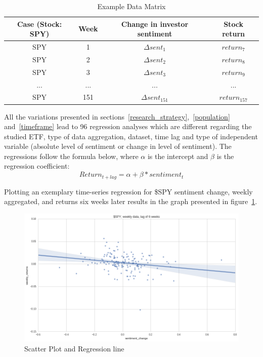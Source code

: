 \begin{table}[ht]
\centering
\begin{tabular}{ c c c c }
Case (Stock: SPY) & Week & Change in investor sentiment & Stock return  \\\hline
SPY & 1 & \( \Delta sent_1 \) & \( return_7 \) \\
SPY & 2 & \( \Delta sent_2 \) & \( return_8 \) \\
SPY & 3 & \( \Delta sent_3 \) & \( return_9 \) \\
... & ... & \( ... \) & \( ... \) \\
SPY & 151 & \( \Delta sent_{151} \) & \( return_{157} \) \\
\end{tabular}
\caption{\label{tab:data-matrix}Example Data Matrix}
\end{table}

All the variations presented in sections~\ref{research_strategy},~\ref{population} and~\ref{timeframe} lead to 96 regression analyses which are different regarding the studied ETF, type of data aggregation, dataset, time lag and type of independent variable (absolute level of sentiment or change in level of sentiment). The regressions follow the formula below, where $\alpha$ is the intercept and $\beta$ is the regression coefficient:
\begin{equation}
Return_{t+lag} = \alpha + \beta * sentiment_t
\end{equation}

Plotting an exemplary time-series regression for \$SPY sentiment change, weekly aggregated, and returns six weeks later results in the graph presented in figure~\ref{fig:figure1}.

\begin{figure}
\centering
\includegraphics[width=1\textwidth]{figures/figure1.png}
\caption{\label{fig:figure1}Scatter Plot and Regression line}
\end{figure}

